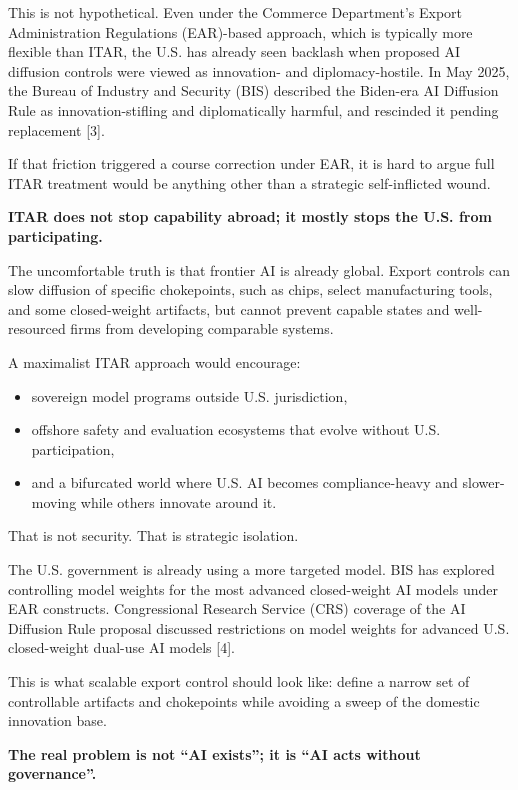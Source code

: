 \documentclass[11pt]{article}
\begin{document}
This is not hypothetical. Even under the Commerce Department's Export
Administration Regulations (EAR)-based approach, which is typically more
flexible than ITAR, the U.S. has already seen backlash when proposed AI
diffusion controls were viewed as innovation- and diplomacy-hostile. In
May 2025, the Bureau of Industry and Security (BIS) described the
Biden-era AI Diffusion Rule as innovation-stifling and diplomatically
harmful, and rescinded it pending replacement {[}3{]}.

If that friction triggered a course correction under EAR, it is hard to
argue full ITAR treatment would be anything other than a strategic
self-inflicted wound.

\textbf{ITAR does not stop capability abroad; it mostly stops the U.S.
from participating.}

The uncomfortable truth is that frontier AI is already global. Export
controls can slow diffusion of specific chokepoints, such as chips,
select manufacturing tools, and some closed-weight artifacts, but cannot
prevent capable states and well-resourced firms from developing
comparable systems.

A maximalist ITAR approach would encourage:

\begin{itemize}
\tightlist
\item
  sovereign model programs outside U.S. jurisdiction,
\item
  offshore safety and evaluation ecosystems that evolve without U.S.
  participation,
\item
  and a bifurcated world where U.S. AI becomes compliance-heavy and
  slower-moving while others innovate around it.
\end{itemize}

That is not security. That is strategic isolation.

The U.S. government is already using a more targeted model. BIS has
explored controlling model weights for the most advanced closed-weight
AI models under EAR constructs. Congressional Research Service (CRS)
coverage of the AI Diffusion Rule proposal discussed restrictions on
model weights for advanced U.S. closed-weight dual-use AI models
{[}4{]}.

This is what scalable export control should look like: define a narrow
set of controllable artifacts and chokepoints while avoiding a sweep of
the domestic innovation base.

\textbf{The real problem is not ``AI exists''; it is ``AI acts without
governance''.}
\end{document}
